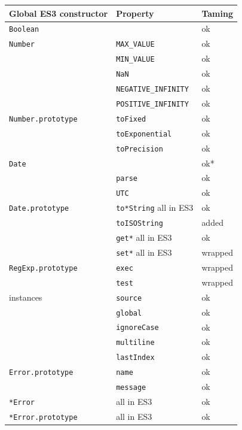 \documentclass[letterpaper,twocolumn,10pt]{article}
\newcommand{\code}[1]{{\tt {#1}}}              %
\begin{document}
\begin{figure}
\begin{tabular}{lll}
  Global ES3 constructor         & Property                    & Taming \\
  \hline 
  \code{Boolean}                 &                             & ok \\
  \hline
  \code{Number}                  & \code{MAX\_VALUE}           & ok \\
                                 & \code{MIN\_VALUE}           & ok \\
                                 & \code{NaN}                  & ok \\
                                 & \code{NEGATIVE\_INFINITY}   & ok \\
                                 & \code{POSITIVE\_INFINITY}   & ok \\
  \code{Number.prototype}        & \code{toFixed}              & ok \\
                                 & \code{toExponential}        & ok \\
                                 & \code{toPrecision}          & ok \\
  \hline
  \code{Date}                    &                             & ok* \\
                                 & \code{parse}                & ok \\
                                 & \code{UTC}                  & ok \\
  \code{Date.prototype}          & \code{to*String} all in ES3 & ok \\
                                 & \code{toISOString}          & added \\
                                 & \code{get*}      all in ES3 & ok \\
                                 & \code{set*}      all in ES3 & wrapped \\
  \hline
  \code{RegExp.prototype}        & \code{exec}                 & wrapped \\
                                 & \code{test}                 & wrapped \\
  instances                      & \code{source}               & ok \\
                                 & \code{global}               & ok \\
                                 & \code{ignoreCase}           & ok \\
                                 & \code{multiline}            & ok \\
                                 & \code{lastIndex}            & ok \\
  \hline 
  \code{Error.prototype}         & \code{name}                 & ok \\
                                 & \code{message}              & ok \\
  \code{*Error}                  &                  all in ES3 & ok \\
  \code{*Error.prototype}        &                  all in ES3 & ok \\
  

\end{tabular}
\end{figure}
\end{document}
